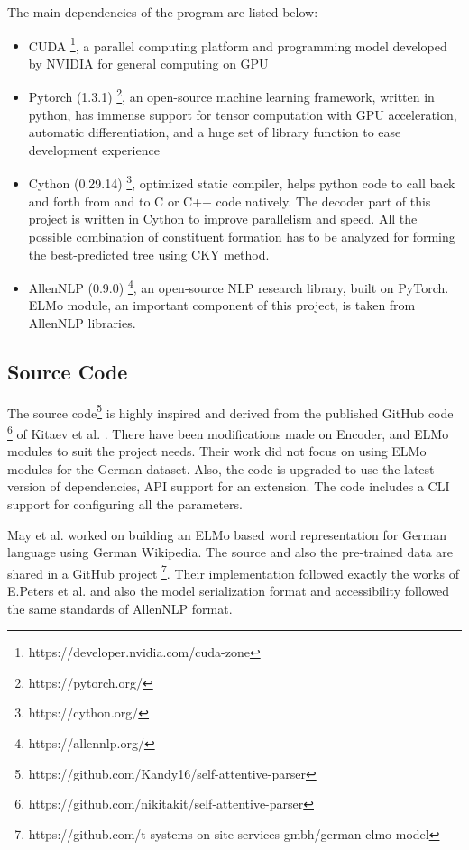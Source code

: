 \documentclass[a4paper, 11pt]{article}
\begin{document}
The main dependencies of the program are listed below:
\begin{itemize}
\item CUDA \footnote{https://developer.nvidia.com/cuda-zone}, a parallel computing platform and programming model developed by NVIDIA for general computing on GPU
\item Pytorch (1.3.1) \footnote{https://pytorch.org/}, an open-source machine learning framework, written in python, has immense support for tensor computation with GPU acceleration, automatic differentiation, and a huge set of library function to ease development experience
\item Cython (0.29.14) \footnote{https://cython.org/}, optimized static compiler, helps python code to call back and forth from and to C or C++ code natively. The decoder part of this project is written in Cython to improve parallelism and speed. All the possible combination of constituent formation has to be analyzed for forming the best-predicted tree using CKY method.
\item AllenNLP (0.9.0) \footnote{https://allennlp.org/}, an open-source NLP research library, built on PyTorch. ELMo module, an important component of this project, is taken from AllenNLP libraries.  
\end{itemize}

\subsection{Source Code}

The source code\footnote{https://github.com/Kandy16/self-attentive-parser} is highly inspired and derived from the published GitHub code \footnote{https://github.com/nikitakit/self-attentive-parser} of Kitaev et al. \parencite*{Kitaev2019}. There have been modifications made on Encoder, and ELMo modules to suit the project needs. Their work did not focus on using ELMo modules for the German dataset. Also, the code is upgraded to use the latest version of dependencies, API support for an extension. The code includes a CLI support for configuring all the parameters.


May et al. \parencite*{GerElmo} worked on building an ELMo based word representation for German language using German Wikipedia. The source and also the pre-trained data are shared in a GitHub project \footnote{https://github.com/t-systems-on-site-services-gmbh/german-elmo-model}. Their implementation followed exactly the works of E.Peters et al. \parencite{peters2018deep} and also the model serialization format and accessibility followed the same standards of AllenNLP format.
\end{document}
